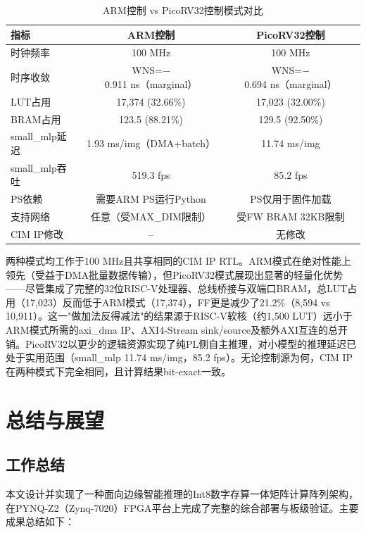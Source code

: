 \documentclass[12pt, a4paper]{article}
\begin{document}
\begin{table}[H]
	\centering
	\caption{ARM控制 vs PicoRV32控制模式对比}
	\begin{tabular}{lcc}
		\toprule
		指标 & ARM控制 & PicoRV32控制 \\
		\midrule
		时钟频率 & 100 MHz & 100 MHz \\
		时序收敛 & WNS=$-$0.911 ns（marginal） & WNS=$-$0.694 ns（marginal） \\
		LUT占用 & 17,374 (32.66\%) & 17,023 (32.00\%) \\
		BRAM占用 & 123.5 (88.21\%) & 129.5 (92.50\%) \\
		small\_mlp延迟 & 1.93 ms/img（DMA+batch） & 11.74 ms/img \\
		small\_mlp吞吐 & 519.3 fps & 85.2 fps \\
		PS依赖 & 需要ARM PS运行Python & PS仅用于固件加载 \\
		支持网络 & 任意（受MAX\_DIM限制） & 受FW BRAM 32KB限制 \\
		CIM IP修改 & -- & 无修改 \\
		\bottomrule
	\end{tabular}
\end{table}


两种模式均工作于100 MHz且共享相同的CIM IP RTL。ARM模式在绝对性能上领先（受益于DMA批量数据传输），但PicoRV32模式展现出显著的轻量化优势——尽管集成了完整的32位RISC-V处理器、总线桥接与双端口BRAM，总LUT占用（17,023）反而低于ARM模式（17,374），FF更是减少了21.2\%（8,594 vs 10,911）。这一"做加法反得减法"的结果源于RISC-V软核（约1,500 LUT）远小于ARM模式所需的axi\_dma IP、AXI4-Stream sink/source及额外AXI互连的总开销。PicoRV32以更少的逻辑资源实现了纯PL侧自主推理，对小模型的推理延迟已处于实用范围（small\_mlp 11.74 ms/img，85.2 fps）。无论控制源为何，CIM IP在两种模式下完全相同，且计算结果bit-exact一致。

\section{总结与展望}

\subsection{工作总结}

本文设计并实现了一种面向边缘智能推理的Int8数字存算一体矩阵计算阵列架构，在PYNQ-Z2（Zynq-7020）FPGA平台上完成了完整的综合部署与板级验证。主要成果总结如下：
\end{document}
